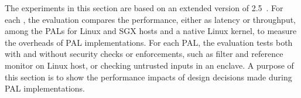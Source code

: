 The experiments in this section are based on an extended version of \lmbench{} 2.5~\cite{McVoy:lmbench}.
For each \hostapi{}, the evaluation %
compares the performance, either as latency or throughput, among the PALs for Linux and SGX hosts
and a native Linux kernel,
to measure the overheads of PAL implementations.
For each PAL,
the evaluation tests both with and without security checks or enforcements,
such as \seccomp{} filter and reference monitor on Linux host,
or checking untrusted inputs in an enclave.
A purpose of this section is to show
the performance impacts of design decisions made during PAL implementations. 



















